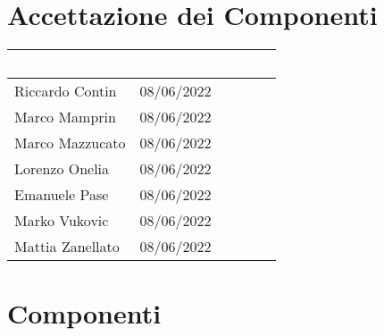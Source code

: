 \section{Accettazione dei Componenti}

\begin{center}
  \centering
  \begin{longtable}{|C{3,5cm}|C{2.2cm}|C{6,5cm}|}
    \hline
    \textcolor[HTML]{FFFFFF}{\textbf{Nominativo}} & \textcolor[HTML]{FFFFFF}{\textbf{Data}} & \textcolor[HTML]{FFFFFF}{\textbf{Firma}} \\ \hline
    Riccardo Contin & 08/06/2022 &  \\ \hline
    Marco Mamprin & 08/06/2022 &  \\ \hline
    Marco Mazzucato & 08/06/2022 &  \\ \hline
    Lorenzo Onelia & 08/06/2022 &  \\ \hline
    Emanuele Pase & 08/06/2022 &  \\ \hline
    Marko Vukovic & 08/06/2022 &  \\ \hline
    Mattia Zanellato & 08/06/2022 &  \\ \hline
  \end{longtable}
\end{center}

\section{Componenti}
\renewcommand\arraystretch{1,5}

